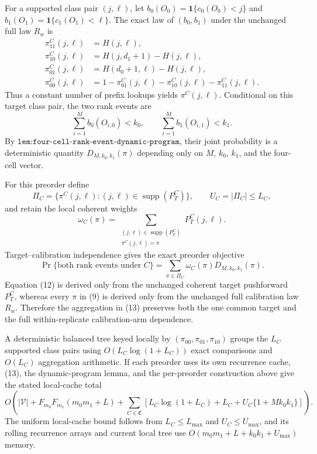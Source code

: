 For a supported class pair \((j,\ell)\), let \(b_0(O_0)=\mathbf 1\{c_0(O_0)<j\}\) and \(b_1(O_1)=\mathbf 1\{c_1(O_1)<\ell\}\). The exact law of \((b_0,b_1)\) under the unchanged full law \(R_w\) is
\[
\begin{aligned}
\pi_{11}^C(j,\ell)&=H(j,\ell),\\
\pi_{10}^C(j,\ell)&=H(j,d_1+1)-H(j,\ell),\\
\pi_{01}^C(j,\ell)&=H(d_0+1,\ell)-H(j,\ell),\\
\pi_{00}^C(j,\ell)&=1-\pi_{01}^C(j,\ell)-\pi_{10}^C(j,\ell)-\pi_{11}^C(j,\ell).
\end{aligned} \tag{9}
\]
Thus a constant number of prefix lookups yields \(\pi^C(j,\ell)\). Conditional on this target class pair, the two rank events are
\[
\sum_{i=1}^M b_0(O_{i,0})<k_0,\qquad \sum_{i=1}^M b_1(O_{i,1})<k_1. \tag{10}
\]
By \(\texttt{lem:four-cell-rank-event-dynamic-program}\), their joint probability is a deterministic quantity \(D_{M,k_0,k_1}(\pi)\) depending only on \(M\), \(k_0\), \(k_1\), and the four-cell vector.

For this preorder define
\[
\Pi_C=\{\pi^C(j,\ell):(j,\ell)\in\operatorname{supp}(P_T^C)\},\qquad U_C=|\Pi_C|\le L_C, \tag{11}
\]
and retain the local coherent weights
\[
\omega_C(\pi)=\sum_{\substack{(j,\ell)\in\operatorname{supp}(P_T^C)\\\pi^C(j,\ell)=\pi}}P_T^C(j,\ell). \tag{12}
\]
Target--calibration independence gives the exact preorder objective
\[
\Pr\{\text{both rank events under }C\}=\sum_{\pi\in\Pi_C}\omega_C(\pi)D_{M,k_0,k_1}(\pi). \tag{13}
\]
Equation (12) is derived only from the unchanged coherent target pushforward \(P_T^C\), whereas every \(\pi\) in (9) is derived only from the unchanged full calibration law \(R_w\). Therefore the aggregation in (13) preserves both the one common target and the full within-replicate calibration-arm dependence.

A deterministic balanced tree keyed locally by \((\pi_{00},\pi_{01},\pi_{10})\) groups the \(L_C\) supported class pairs using \(O(L_C\log(1+L_C))\) exact comparisons and \(O(L_C)\) aggregation arithmetic. If each preorder uses its own recurrence cache, (13), the dynamic-program lemma, and the per-preorder construction above give the stated local-cache total
\[
O\!\left(|\mathcal V|+F_{m_0}F_{m_1}(m_0m_1+L)+\sum_{C\in\mathfrak C}\left[L_C\log(1+L_C)+L_C+U_C\{1+Mk_0k_1\}\right]\right). \tag{14}
\]
The uniform local-cache bound follows from \(L_C\le L_{\max}\) and \(U_C\le U_{\max}\), and its rolling recurrence arrays and current local tree use \(O(m_0m_1+L+k_0k_1+U_{\max})\) memory.

